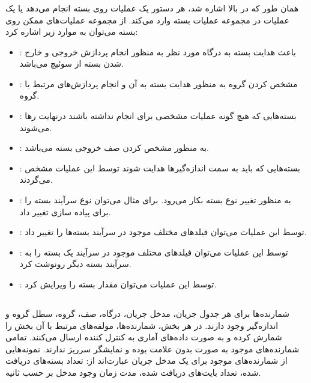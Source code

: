 \subsubsection{}
همان طور که در بالا اشاره شد، هر دستور یک عملیات روی بسته انجام می‌دهد یا یک عملیات در مجموعه عملیات بسته وارد می‌کند. از مجموعه عملیات‌های ممکن روی بسته می‌توان به موارد زیر اشاره کرد:
\begin{itemize}
	\item {}:
باعث هدایت بسته به درگاه مورد نظر به منظور انجام پردازش خروجی و خارج شدن بسته از سوئیچ می‌باشد.
	\item {}:
مشخص کردن گروه به منظور هدایت بسته به آن و انجام پردازش‌های مرتبط با گروه.
	\item {}:
بسته‌هایی که هیچ گونه عملیات مشخصی برای انجام نداشته باشند درنهایت رها می‌شوند.
	\item {}:
به منظور مشخص کردن صف خروجی بسته می‌باشد.
	\item {}:
بسته‌هایی که باید به سمت اندازه‌گیر‌ها هدایت شوند توسط این عملیات مشخص می‌گردند.
	\item {}:
به منظور تغییر نوع بسته بکار می‌رود. برای مثال می‌توان نوع سرآیند بسته را برای پیاده سازی  تغییر داد.
	\item {}:
توسط این عملیات می‌توان فیلد‌های مختلف موجود در سرآیند بسته‌ها را تغییر داد.
	\item {}:
توسط این عملیات می‌توان فیلد‌های مختلف موجود در سرآیند یک بسته را به سرآیند بسته دیگر رونوشت کرد.
	\item {}:
توسط این عملیات می‌توان مقدار  بسته را ویرایش کرد.
\end{itemize}

\subsection{}
شمارنده‌ها برای هر جدول جریان، مدخل جریان، درگاه، صف، گروه، سطل گروه و اندازه‌گیر وجود دارند. در هر بخش، شمارنده‌ها، مولفه‌های مرتبط با آن بخش را شمارش کرده و به صورت داده‌های آماری به کنترل کننده ارسال می‌کنند. تمامی شمارنده‌های موجود به صورت بدون علامت بوده و نمایشگر سرریز ندارند. نمونه‌هایی از شمارنده‌های موجود برای یک مدخل جریان عبارت‌اند از: تعداد بسته‌های دریافت شده، تعداد بایت‌‌های دریافت شده، مدت زمان وجود مدخل بر حسب ثانیه.
